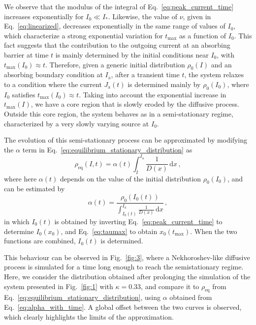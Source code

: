 We observe that the modulus of the integral of Eq.~\eqref{eq:peak_current_time} increases exponentially for $I_0 \ll I_\ast$. Likewise, the value of $\nu$, given in Eq.~\eqref{eq:linearized}, decreases exponentially in the same range of values of $I_0$, which characterize a strong exponential variation for $t_\text{max}$ as a function of $I_0$. This fact suggests that the contribution to the outgoing current at an absorbing barrier at time $t$ is mainly determined by the initial conditions near $I_0$, with $t_\text{max}(I_0) \approx t$. Therefore, given a generic initial distribution $\rho_0(I)$ and an absorbing boundary condition at $I_\mathrm{a}$, after a transient time $t$, the system relaxes to a condition where the current $J_\mathrm{a}(t)$ is determined mainly by $\rho_0(I_0)$, where $I_0$ satisfies $t_\text{max}(I_0) \approx t$. Taking into account the exponential increase in $t_\text{max}(I)$, we have a core region that is slowly eroded by the diffusive process. Outside this core region, the system behaves as in a semi-stationary regime, characterized by a very slowly varying source at $I_0$.

The evolution of this semi-stationary process can be approximated by modifying the $\alpha$ term in Eq.~\eqref{eq:equilibrium_stationary_distribution} as
\begin{equation}
    \rho_\mathrm{eq}(I, t) = \alpha(t) \int_I^{I_\mathrm{a}} \frac{1}{D(x)}\,\mathrm{d}x\,,
    \label{eq:semi_stationary_distribution}
\end{equation}
where here $\alpha(t)$ depends on the value of the initial distribution $\rho_0(I_0)$, and can be estimated by
\begin{equation}
    \alpha(t) = \frac{\rho_0\left(I_0(t)\right)}{\displaystyle{ \int_{I_0(t)}^{I_\mathrm{a}} \frac{1}{D(x)}\,\mathrm{d}x}}\,,
    \label{eq:alpha_with_time}
\end{equation}
in which $I_0(t)$ is obtained by inverting Eq.~\eqref{eq:peak_current_time} to determine $I_0(x_0)$, and Eq.~\eqref{eq:taumax} to obtain $x_0(t_\mathrm{max})$. When the two functions are combined, $I_0(t)$ is determined.

This behaviour can be observed in Fig.~\ref{fig:3}, where a Nekhoroshev-like diffusive process is simulated for a time long enough to reach the semistationary regime. Here, we consider the distribution obtained after prolonging the simulation of the system presented in Fig.~\ref{fig:1} with $\kappa=0.33$, and compare it to $\rho_\mathrm{eq}$ from Eq.~\eqref{eq:equilibrium_stationary_distribution}, using $\alpha$ obtained from Eq.~\eqref{eq:alpha_with_time}. A global offset between the two curves is observed, which clearly highlights the limits of the approximation. 

